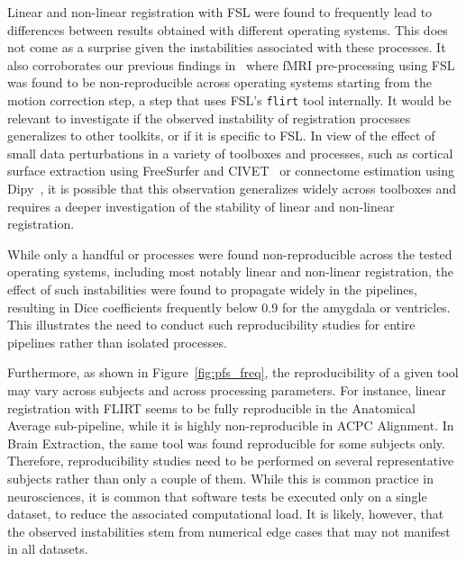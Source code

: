 \documentclass[a4paper,num-refs]{oup-contemporary}
\begin{document}
Linear and non-linear registration with FSL were found to
frequently lead to differences between results obtained with different
operating systems. This does not come as a surprise given the instabilities
associated with these processes. It also corroborates our previous findings
in~\cite{Glatard2015} where fMRI pre-processing using FSL was found to be
non-reproducible across operating systems starting from the motion
correction step, a step that uses FSL's \texttt{flirt} tool internally. It
would be relevant to investigate if the observed instability of
registration processes generalizes to other toolkits, or if it is specific
to FSL. In view of the effect of small data perturbations in a variety of
toolboxes and processes, such as cortical surface extraction using
FreeSurfer and CIVET~\cite{Lewis2017-ll} or connectome estimation using
Dipy~\cite{kiar2019comparing}, it is possible that this observation
generalizes widely across toolboxes and requires a deeper investigation of
the stability of linear and non-linear registration.

While only a handful or processes were found non-reproducible across the
tested operating systems, including most notably linear and non-linear
registration, the effect of such instabilities were found to propagate
widely in the pipelines, resulting in Dice coefficients frequently below
0.9 for the amygdala or ventricles. This illustrates the need to conduct such 
reproducibility studies for entire pipelines rather than isolated processes.

Furthermore, as shown in Figure~\ref{fig:pfs_freq}, the reproducibility of
a given tool may vary across subjects and across processing parameters. For
instance, linear registration with FLIRT seems to be fully reproducible in
the Anatomical Average sub-pipeline, while it is highly non-reproducible in
ACPC Alignment. In Brain Extraction, the same tool was found reproducible
for some subjects only. Therefore, reproducibility studies need to be
performed on several representative subjects rather than only a couple of
them. While this is common practice in neurosciences, it is common that
software tests be executed only on a single dataset, to reduce the
associated computational load. It is likely, however, that the observed
instabilities stem from numerical edge cases that may not manifest in all
datasets. 
\end{document}
